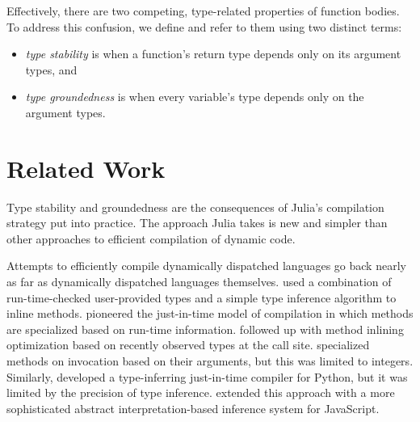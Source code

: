 \documentclass[oneside,openright,titlepage,numbers=noenddot,%
headinclude,footinclude,cleardoublepage=empty,abstract=on,
BCOR=5mm,paper=a4,fontsize=11pt,
dvipsnames
]{scrreprt}
\begin{document}
Effectively, there are two competing, type-related properties
of function bodies. To address this confusion, we
define and refer to them using two distinct terms:
\begin{itemize}
  \item \emph{type stability} is when a function's return type depends only on
    its argument types, and
  \item \emph{type groundedness} is when every variable's type depends
    only on the argument types.
\end{itemize}




\chapter{Related Work}%
\label{chap-related}

Type stability and groundedness are the consequences of Julia's compilation
strategy put into practice. The approach Julia takes is new and simpler than
other approaches to efficient compilation of dynamic code.

Attempts to efficiently compile dynamically dispatched languages go back nearly
as far as dynamically dispatched languages themselves.
\citet{HurricaneSmalltalk} used a combination of run-time-checked user-provided
types and a simple type inference algorithm to inline methods. \citet{CU89}
pioneered the just-in-time model of compilation in which methods are specialized
based on run-time information. \citet{holzle1994odd} followed up with method
inlining optimization based on recently observed types at the call site.
\citet{Psyco2004} specialized methods on invocation based on their arguments,
but this was limited to integers. Similarly, \citet{cannon2005localized} developed a
type-inferring just-in-time compiler for Python, but it was limited by the
precision of type inference. \citet{RATA} extended this approach with a more
sophisticated abstract interpretation-based inference system for JavaScript.
\end{document}
